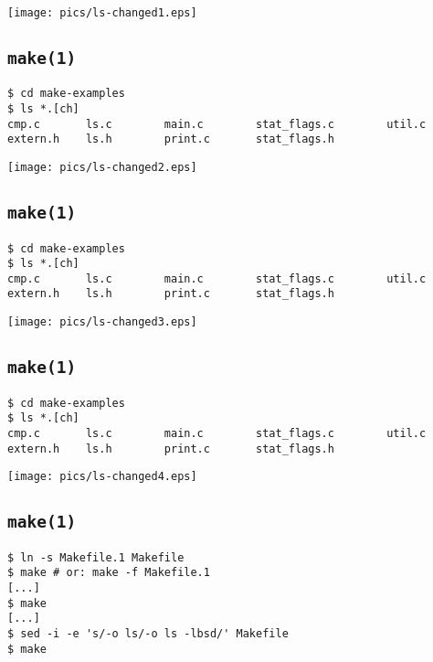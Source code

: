 \documentclass[xga]{xdvislides}
\begin{document}
\begin{center}
	\texttt{[image: pics/ls-changed1.eps]}
\end{center}

\subsection{{\tt make(1)}}

\begin{verbatim}
$ cd make-examples
$ ls *.[ch]
cmp.c       ls.c        main.c        stat_flags.c        util.c
extern.h    ls.h        print.c       stat_flags.h
\end{verbatim}

\begin{center}
	\texttt{[image: pics/ls-changed2.eps]}
\end{center}

\subsection{{\tt make(1)}}

\begin{verbatim}
$ cd make-examples
$ ls *.[ch]
cmp.c       ls.c        main.c        stat_flags.c        util.c
extern.h    ls.h        print.c       stat_flags.h
\end{verbatim}

\begin{center}
	\texttt{[image: pics/ls-changed3.eps]}
\end{center}

\subsection{{\tt make(1)}}

\begin{verbatim}
$ cd make-examples
$ ls *.[ch]
cmp.c       ls.c        main.c        stat_flags.c        util.c
extern.h    ls.h        print.c       stat_flags.h
\end{verbatim}

\begin{center}
	\texttt{[image: pics/ls-changed4.eps]}
\end{center}

\subsection{{\tt make(1)}}
\begin{verbatim}
$ ln -s Makefile.1 Makefile
$ make # or: make -f Makefile.1
[...]
$ make
[...]
$ sed -i -e 's/-o ls/-o ls -lbsd/' Makefile
$ make
\end{verbatim}
\end{document}
